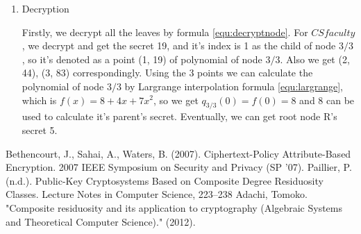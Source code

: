 \documentclass[a4paper,11pt]{article}
\begin{document}
\begin{itemize}
\begin{enumerate}
\item Decryption

Firstly, we decrypt all the leaves by formula \ref{equ:decryptnode}. For ${CS faculty}$ , we decrypt and get the secret 19,  and it's index is 1 as the child of node $3/3$, so it's denoted as a point (1, 19) of polynomial of node $3/3$. 
Also we get (2, 44), (3, 83) correspondingly.  Using the 3 points we can calculate the polynomial of node $3/3$  by Largrange interpolation formula \ref{equ:largrange}, which is $f(x) = 8 + 4x + 7x^2$, so we get $q_{3/3}(0) = f(0) = 8$ and 8 can be used to calculate it's parent's secret.  
Eventually, we can get root node R's secret 5.

\end{enumerate}

\end{itemize}

 \begin{thebibliography}{99}
  Bethencourt, J., Sahai, A., Waters, B. (2007). Ciphertext-Policy Attribute-Based Encryption. 2007 IEEE Symposium on Security and Privacy (SP ’07).
 Paillier, P. (n.d.). Public-Key Cryptosystems Based on Composite Degree Residuosity Classes. Lecture Notes in Computer Science, 223–238
 Adachi, Tomoko. "Composite residuosity and its application to cryptography (Algebraic Systems and Theoretical Computer Science)." (2012).
 \end{thebibliography}

 
\end{document}
